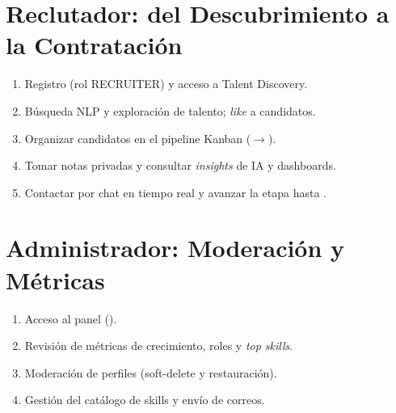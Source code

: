 \section{Reclutador: del Descubrimiento a la Contratación}
\label{sec:anexo_journey_recruiter}
\begin{enumerate}[noitemsep]
    \item Registro (rol RECRUITER) y acceso a Talent Discovery.
    \item Búsqueda NLP y exploración de talento; \textit{like} a candidatos.
    \item Organizar candidatos en el pipeline Kanban ($\to$).
    \item Tomar notas privadas y consultar \textit{insights} de IA y dashboards.
    \item Contactar por chat en tiempo real y avanzar la etapa hasta .
\end{enumerate}

\section{Administrador: Moderación y Métricas}
\label{sec:anexo_journey_admin}
\begin{enumerate}[noitemsep]
    \item Acceso al panel ().
    \item Revisión de métricas de crecimiento, roles y \textit{top skills}.
    \item Moderación de perfiles (soft-delete y restauración).
    \item Gestión del catálogo de skills y envío de correos.
\end{enumerate}

\clearpage
